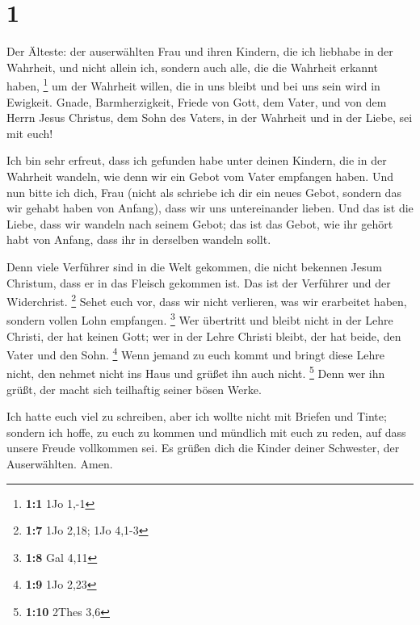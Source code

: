 \hypertarget{section}{%
\section{1}\label{section}}

 Der Älteste: der auserwählten Frau und ihren Kindern, die
ich liebhabe in der Wahrheit, und nicht allein ich, sondern auch alle,
die die Wahrheit erkannt haben, \footnote{\textbf{1:1} 1Jo 1,-1}
 um der Wahrheit willen, die in uns bleibt und bei uns
sein wird in Ewigkeit.  Gnade, Barmherzigkeit, Friede von
Gott, dem Vater, und von dem Herrn Jesus Christus, dem Sohn des Vaters,
in der Wahrheit und in der Liebe, sei mit euch!

 Ich bin sehr erfreut, dass ich gefunden habe unter deinen
Kindern, die in der Wahrheit wandeln, wie denn wir ein Gebot vom Vater
empfangen haben.  Und nun bitte ich dich, Frau (nicht als
schriebe ich dir ein neues Gebot, sondern das wir gehabt haben von
Anfang), dass wir uns untereinander lieben.  Und das ist
die Liebe, dass wir wandeln nach seinem Gebot; das ist das Gebot, wie
ihr gehört habt von Anfang, dass ihr in derselben wandeln sollt.

 Denn viele Verführer sind in die Welt gekommen, die nicht
bekennen Jesum Christum, dass er in das Fleisch gekommen ist. Das ist
der Verführer und der Widerchrist. \footnote{\textbf{1:7} 1Jo 2,18; 1Jo
  4,1-3}  Sehet euch vor, dass wir nicht verlieren, was
wir erarbeitet haben, sondern vollen Lohn empfangen. \footnote{\textbf{1:8}
  Gal 4,11}  Wer übertritt und bleibt nicht in der Lehre
Christi, der hat keinen Gott; wer in der Lehre Christi bleibt, der hat
beide, den Vater und den Sohn. \footnote{\textbf{1:9} 1Jo 2,23}
 Wenn jemand zu euch kommt und bringt diese Lehre nicht,
den nehmet nicht ins Haus und grüßet ihn auch nicht. \footnote{\textbf{1:10}
  2Thes 3,6}  Denn wer ihn grüßt, der macht sich
teilhaftig seiner bösen Werke.

 Ich hatte euch viel zu schreiben, aber ich wollte nicht
mit Briefen und Tinte; sondern ich hoffe, zu euch zu kommen und mündlich
mit euch zu reden, auf dass unsere Freude vollkommen sei.
 Es grüßen dich die Kinder deiner Schwester, der
Auserwählten. Amen.
